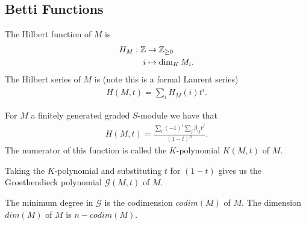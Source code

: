 \subsection{Betti Functions}

\begin{definition}
    The Hilbert function of $M$ is
    \begin{align*}
        H_M : \mathbb{Z} &\to \mathbb{Z}_{\geq 0}\\
        i &\mapsto \dim_K M_i.
    \end{align*}
    The Hilbert series of $M$ is (note this is a formal Laurent series)
    \begin{align*}
        H(M,t) = \sum_i H_M (i) t^i.
    \end{align*}
\end{definition}

\begin{proposition}
    For $M$ a finitely generated graded $S$-module we have that
    \begin{align*}
        H(M,t) = \frac{\sum_i (-1)^i \sum_j \beta_{ij} t^j }{(1-t)^n}.
    \end{align*}
    The numerator of this function is called the $K$-polynomial $K(M,t)$ of $M$.
\end{proposition}

\begin{definition}
    Taking the $K$-polynomial and substituting $t$ for $(1-t)$ gives us the Groethendieck polynomial $\mathscr{G}(M,t)$ of $M$.
\end{definition}

\begin{definition}
    The minimum degree in $\mathscr{G}$ is the codimension $codim (M)$ of $M$. The dimension $dim (M)$ of $M$ is $n - codim(M)$.
\end{definition}

